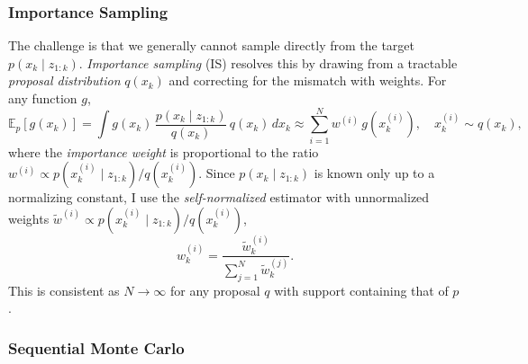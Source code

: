 \documentclass{article}
\begin{document}
\subsubsection*{Importance Sampling}

The challenge is that we generally cannot sample directly from the target $p(x_k \mid z_{1:k})$.
\textit{Importance sampling} (IS) resolves this by drawing from a tractable \textit{proposal distribution} $q(x_k)$ and correcting for the mismatch with weights. For any function $g$,
\begin{equation}
    \mathbb{E}_{p}[g(x_k)] = \int g(x_k)\, \frac{p(x_k \mid z_{1:k})}{q(x_k)}\, q(x_k)\, dx_k \approx \sum_{i=1}^N w^{(i)}\, g\!\left(x_k^{(i)}\right), \quad x_k^{(i)} \sim q(x_k),
\end{equation}
where the \textit{importance weight} is proportional to the ratio $w^{(i)} \propto p(x_k^{(i)} \mid z_{1:k}) / q(x_k^{(i)})$. Since $p(x_k \mid z_{1:k})$ is known only up to a normalizing constant, I use the \textit{self-normalized} estimator with unnormalized weights $\tilde{w}^{(i)} \propto p(x_k^{(i)} \mid z_{1:k}) / q(x_k^{(i)})$,
\begin{equation}
    w_k^{(i)} = \frac{\tilde{w}_k^{(i)}}{\displaystyle\sum_{j=1}^N \tilde{w}_k^{(j)}}.
\end{equation}
This is consistent as $N \to \infty$ for any proposal $q$ with support containing that of $p$.

\subsubsection*{Sequential Monte Carlo}
\end{document}
